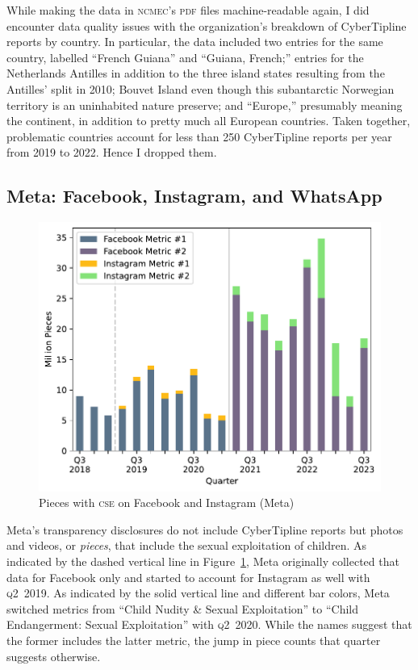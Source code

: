 \documentclass[nonacm,screen]{acmart}
\newcommand\V[1]{\textsc{\MakeLowercase{#1}}}
\begin{document}
While making the data in \V{NCMEC}'s \V{PDF} files machine-readable again, I did
encounter data quality issues with the organization's breakdown of CyberTipline
reports by country. In particular, the data included two entries for the same
country, labelled ``French Guiana'' and ``Guiana, French;'' entries for the
Netherlands Antilles in addition to the three island states resulting from the
Antilles' split in 2010; Bouvet Island even though this subantarctic Norwegian
territory is an uninhabited nature preserve; and ``Europe,'' presumably meaning
the continent, in addition to pretty much all European countries. Taken
together, problematic countries account for less than 250 CyberTipline reports
per year from 2019 to 2022. Hence I dropped them.


\subsection{Meta: Facebook, Instagram, and WhatsApp}

\begin{figure}
\centering\libertineLF
\includegraphics[scale=0.6]{figure/fb-insta-pieces}
\caption{Pieces with \V{CSE} on Facebook and Instagram (Meta)}
\label{fig:meta-pieces}
\end{figure}

Meta's transparency disclosures do not include CyberTipline reports but photos
and videos, or \emph{pieces}, that include the sexual exploitation of children.
As indicated by the dashed vertical line in Figure~\ref{fig:meta-pieces}, Meta
originally collected that data for Facebook only and started to account for
Instagram as well with \V{Q2}~2019. As indicated by the solid vertical line and
different bar colors, Meta switched metrics from ``Child Nudity \& Sexual
Exploitation'' to ``Child Endangerment: Sexual Exploitation'' with \V{Q2}~2020.
While the names suggest that the former includes the latter metric, the jump in
piece counts that quarter suggests otherwise.
\end{document}
